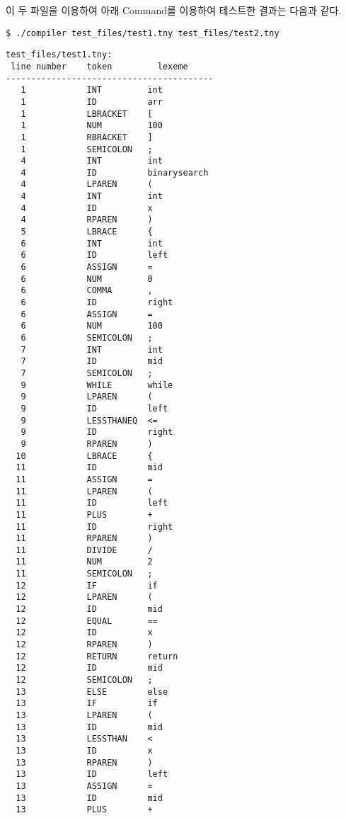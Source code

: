 \documentclass[a4paper, 10pt]{oblivoir}
\begin{document}



이 두 파일을 이용하여 아래 Command를 이용하여 테스트한 결과는 다음과 같다.
\begin{lstlisting}
$ ./compiler test_files/test1.tny test_files/test2.tny
\end{lstlisting}

\begin{lstlisting}[caption=Output, frame=single]
test_files/test1.tny:
 line number    token         lexeme    
-----------------------------------------
   1            INT         int
   1            ID          arr
   1            LBRACKET    [
   1            NUM         100
   1            RBRACKET    ]
   1            SEMICOLON   ;
   4            INT         int
   4            ID          binarysearch
   4            LPAREN      (
   4            INT         int
   4            ID          x
   4            RPAREN      )
   5            LBRACE      {
   6            INT         int
   6            ID          left
   6            ASSIGN      =
   6            NUM         0
   6            COMMA       ,
   6            ID          right
   6            ASSIGN      =
   6            NUM         100
   6            SEMICOLON   ;
   7            INT         int
   7            ID          mid
   7            SEMICOLON   ;
   9            WHILE       while
   9            LPAREN      (
   9            ID          left
   9            LESSTHANEQ  <=
   9            ID          right
   9            RPAREN      )
  10            LBRACE      {
  11            ID          mid
  11            ASSIGN      =
  11            LPAREN      (
  11            ID          left
  11            PLUS        +
  11            ID          right
  11            RPAREN      )
  11            DIVIDE      /
  11            NUM         2
  11            SEMICOLON   ;
  12            IF          if
  12            LPAREN      (
  12            ID          mid
  12            EQUAL       ==
  12            ID          x
  12            RPAREN      )
  12            RETURN      return
  12            ID          mid
  12            SEMICOLON   ;
  13            ELSE        else
  13            IF          if
  13            LPAREN      (
  13            ID          mid
  13            LESSTHAN    <
  13            ID          x
  13            RPAREN      )
  13            ID          left
  13            ASSIGN      =
  13            ID          mid
  13            PLUS        +

\end{lstlisting}
\end{document}

